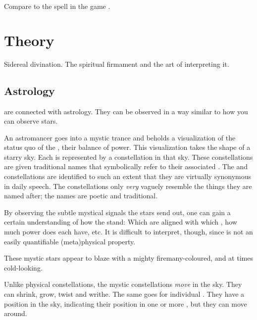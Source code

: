 Compare to the spell  in the game \cite{VideoGame:DiabloII}. 















\section{\Matrix Theory}
Sidereal divination. 
The spiritual firmament and the art of interpreting it. 







\subsection{Astrology}
\Matrices{} are connected with {astrology}. 
They can be observed in a way similar to how you can observe stars. 

An astromancer goes into a mystic trance and beholds a visualization of the status quo of the \matrices, their balance of power. 
This visualization takes the shape of a starry sky. 
Each \matrix{} is represented by a constellation in that sky. 
These constellations are given traditional names that symbolically refer to their associated \matrix. 
The \matrices{} and constellations are identified to such an extent that they are virtually synonymous in daily speech. 
The constellations only \emph{very} vaguely resemble the things they are named after; the names are poetic and traditional. 

By observing the subtle mystical signals the stars send out, one can gain a certain understanding of how the \matrices{} stand: 
Which \vertices{} are aligned with which \matrices, how much power does each \matrix{} have, etc. 
It is difficult to interpret, though, since  is not an easily quantifiable (meta)physical property. 

These mystic stars appear to blaze with a mighty fire\dash many-coloured, and at times cold-looking.

Unlike physical constellations, the mystic constellations \emph{move} in the sky. 
They can shrink, grow, twist and writhe. 
The same goes for individual \vertices.
They have a position in the sky, indicating their position in one or more \matrices, but they can move around.  

